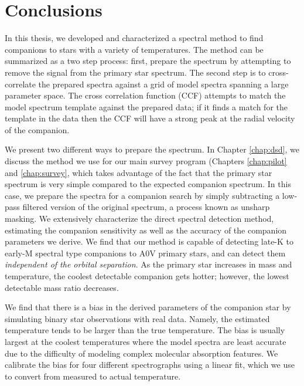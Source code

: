 \documentclass{utthesis}
\begin{document}



\chapter{Conclusions}

In this thesis, we developed and characterized a spectral method to find companions to stars with a variety of temperatures. The method can be summarized as a two step process: first, prepare the spectrum by attempting to remove the signal from the primary star spectrum. The second step is to cross-correlate the prepared spectra against a grid of model spectra spanning a large parameter space. The cross correlation function (CCF) attempts to match the model spectrum template against the prepared data; if it finds a match for the template in the data then the CCF will have a strong peak at the radial velocity of the companion.

We present two different ways to prepare the spectrum. In Chapter \ref{chap:dsd}, we discuss the method we use for our main survey program (Chapters \ref{chap:pilot} and \ref{chap:survey}, which takes advantage of the fact that the primary star spectrum is very simple compared to the expected companion spectrum. In this case, we prepare the spectra for a companion search by simply subtracting a low-pass filtered version of the original spectrum, a process known as unsharp masking. We extensively characterize the direct spectral detection method, estimating the companion sensitivity as well as the accuracy of the companion parameters we derive. We find that our method is capable of detecting late-K to early-M spectral type companions to A0V primary stars, and can detect them \emph{independent of the orbital separation}. As the primary star increases in mass and temperature, the coolest detectable companion gets hotter; however, the lowest detectable mass ratio decreases. 

We find that there is a bias in the derived parameters of the companion star by simulating binary star observations with real data. Namely, the estimated temperature tends to be larger than the true temperature. The bias is usually largest at the coolest temperatures where the model spectra are least accurate due to the difficulty of modeling complex molecular absorption features. We calibrate the bias for four different spectrographs using a linear fit, which we use to convert from measured to actual temperature.
\end{document}
